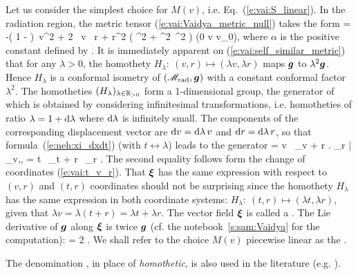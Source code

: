 Let us consider the simplest choice for $M(v)$, i.e.
Eq.~(\ref{e:vai:S_linear}).
In the radiation region, the metric tensor (\ref{e:vai:Vaidya_metric_null})
takes the form
\be \label{e:vai:self_similar_metric}
     = -\left( 1 - \alpha {} \right)\, \dd v^2
            + 2 \, \dd v \, \dd r
        + r^2 \left( \dd\th^2 + \sin^2\th\, \dd\ph^2 \right) \qquad
        (0 \leq v \leq v_0),
\ee
where $\alpha$ is the positive constant defined by
\be \label{e:vai:def_alpha}
   .
\ee
It is immediately apparent on (\ref{e:vai:self_similar_metric})
that for any $\lambda > 0$, the homothety $H_\lambda:\ (v, r) \mapsto (\lambda v, \lambda r)$
maps $\bm{g}$ to $\lambda^2 \bm{g}$. Hence $H_\lambda$ is a
conformal isometry of
$(\mathscr{M}_{\rm rad},\bm{g})$ with a constant conformal factor $\lambda^2$. The homotheties $(H_\lambda)_{\lambda\in \mathbb{R}_{>0}}$
form a 1-dimensional
group, the generator of which is obtained by considering infinitesimal transformations,
i.e. homotheties of ratio $\lambda = 1 + \mathrm{d}\lambda$ where $\mathrm{d}\lambda$ is
infinitely small. The components of the corresponding displacement vector are $\mathrm{d} v = \mathrm{d}\lambda \, v$
and $\mathrm{d} r = \mathrm{d}\lambda\,  r$, so that formula~(\ref{e:neh:xi_dxdt}) (with $t \leftrightarrow \lambda$)
leads to the generator
\be \label{e:vai:hom_Killing}
    \w{\xi} = v \, \wpar_v + r \left. \wpar_r \right| _{v,\th,\ph}
            = t \, \wpar_t + r \, \wpar_r .
\ee
The second equality follows form the change of coordinates (\ref{e:vai:t_v_r}).
That $\bm{\xi}$ has the same expression with respect to $(v, r)$ and $(t, r)$
coordinates should not be surprising since the homothety $H_\lambda$ has the
same expression in both coordinate systems:  $H_\lambda:\ (t, r) \mapsto (\lambda t, \lambda r)$,
given that $\lambda v = \lambda(t + r) = \lambda t + \lambda r$.
The vector field $\bm{\xi}$ is called a
.
The Lie derivative of $\bm{g}$ along $\bm{\xi}$ is twice $\bm{g}$ (cf. the notebook~\ref{s:sam:Vaidya}
for the computation):
\be \label{e:vai:Lie_xi_g}
    \Lie{\xi}  = 2  .
\ee
We shall refer to the choice $M(v)$ piecewise linear
as the .

\begin{remark}
The denomination ,
in place of \emph{homothetic},
is also used in the literature (e.g. \cite{Nolan01,Nolan07}).
\end{remark}

